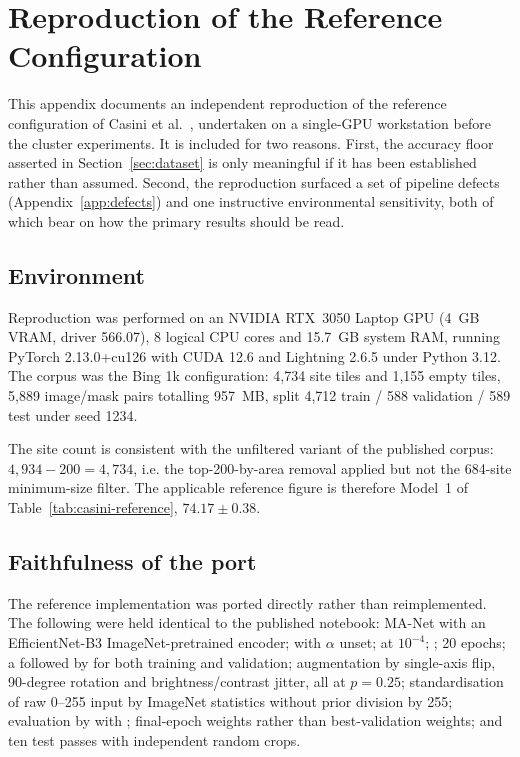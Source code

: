 \section{Reproduction of the Reference Configuration}
\label{app:reproduction}

This appendix documents an independent reproduction of the reference configuration
of Casini et al.~\cite{Casini23}, undertaken on a single-GPU workstation before the
cluster experiments.
It is included for two reasons.
First, the accuracy floor asserted in Section~\ref{sec:dataset} is only meaningful if
it has been established rather than assumed.
Second, the reproduction surfaced a set of pipeline defects
(Appendix~\ref{app:defects}) and one instructive environmental sensitivity, both of
which bear on how the primary results should be read.

\subsection{Environment}

Reproduction was performed on an NVIDIA RTX~3050 Laptop GPU (4~GB VRAM,
driver 566.07), 8 logical CPU cores and 15.7~GB system RAM, running
PyTorch 2.13.0+cu126 with CUDA 12.6 and Lightning 2.6.5 under Python 3.12.
The corpus was the Bing 1k configuration: 4{,}734 site tiles and 1{,}155 empty
tiles, 5{,}889 image/mask pairs totalling 957~MB, split 4{,}712 train /
588 validation / 589 test under seed 1234.

The site count is consistent with the unfiltered variant of the published corpus:
$4{,}934 - 200 = 4{,}734$, i.e. the top-200-by-area removal applied but not the
684-site minimum-size filter.
The applicable reference figure is therefore Model~1 of
Table~\ref{tab:casini-reference}, $74.17 \pm 0.38$.

\subsection{Faithfulness of the port}
\label{sec:repro-faithfulness}

The reference implementation was ported directly rather than reimplemented.
The following were held identical to the published notebook: MA-Net with an
EfficientNet-B3 ImageNet-pretrained encoder;  with
$\alpha$ unset;  at $10^{-4}$; ; 20 epochs; a
 followed by  for both training and
validation; augmentation by single-axis flip, 90-degree rotation and
brightness/contrast jitter, all at $p = 0.25$; standardisation of raw
0--255 input by ImageNet statistics without prior division by 255; evaluation by
 with ; final-epoch weights
rather than best-validation weights; and ten test passes with independent random
crops.

